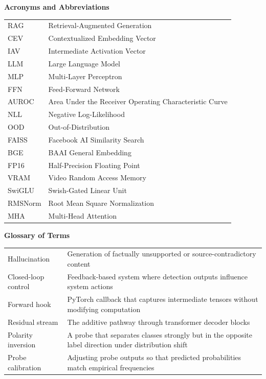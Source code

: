 \vspace{0.8cm}

\newpage
\noindent \textbf{Acronyms and Abbreviations}

\vspace{0.5cm}

\begin{tabular}{@{}l l@{}}
RAG     & Retrieval-Augmented Generation \\
CEV     & Contextualized Embedding Vector \\
IAV     & Intermediate Activation Vector \\
LLM     & Large Language Model \\
MLP     & Multi-Layer Perceptron \\
FFN     & Feed-Forward Network \\
AUROC   & Area Under the Receiver Operating Characteristic Curve \\
NLL     & Negative Log-Likelihood \\
OOD     & Out-of-Distribution \\
FAISS   & Facebook AI Similarity Search \\
BGE     & BAAI General Embedding \\
FP16    & Half-Precision Floating Point \\
VRAM    & Video Random Access Memory \\
SwiGLU  & Swish-Gated Linear Unit \\
RMSNorm & Root Mean Square Normalization \\
MHA     & Multi-Head Attention \\
\end{tabular}

\vspace{0.8cm}

\noindent \textbf{Glossary of Terms}

\vspace{0.5cm}

\begin{tabular}{@{}l p{10cm}@{}}
Hallucination       & Generation of factually unsupported or source-contradictory content \\
Closed-loop control & Feedback-based system where detection outputs influence system actions \\
Forward hook        & PyTorch callback that captures intermediate tensors without modifying computation \\
Residual stream     & The additive pathway through transformer decoder blocks \\
Polarity inversion  & A probe that separates classes strongly but in the opposite label direction under distribution shift \\
Probe calibration   & Adjusting probe outputs so that predicted probabilities match empirical frequencies \\
\end{tabular}

\setcounter{secnumdepth}{3}
